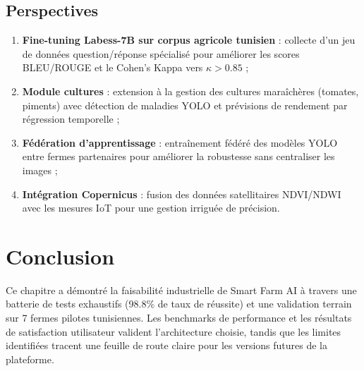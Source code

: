\subsection{Perspectives}

\begin{enumerate}
  \item \textbf{Fine-tuning Labess-7B sur corpus agricole tunisien} :
        collecte d'un jeu de données question/réponse spécialisé pour
        améliorer les scores BLEU/ROUGE et le Cohen's Kappa vers $\kappa > 0.85$ ;
  \item \textbf{Module cultures} : extension à la gestion des cultures
        maraîchères (tomates, piments) avec détection de maladies YOLO et
        prévisions de rendement par régression temporelle ;
  \item \textbf{Fédération d'apprentissage} : entraînement fédéré des modèles
        YOLO entre fermes partenaires pour améliorer la robustesse sans
        centraliser les images ;
  \item \textbf{Intégration Copernicus} : fusion des données satellitaires
        NDVI/NDWI avec les mesures IoT pour une gestion irriguée de précision.
\end{enumerate}

\section*{Conclusion}
{}
Ce chapitre a démontré la faisabilité industrielle de Smart Farm AI à travers
une batterie de tests exhaustifs (98.8\% de taux de réussite) et une validation
terrain sur 7 fermes pilotes tunisiennes. Les benchmarks de performance et
les résultats de satisfaction utilisateur valident l'architecture choisie,
tandis que les limites identifiées tracent une feuille de route claire pour
les versions futures de la plateforme.

